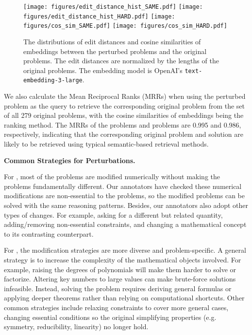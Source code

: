     \begin{figure}[htbp]
        \centering
        \texttt{[image: figures/edit\_distance\_hist\_SAME.pdf]}
        \texttt{[image: figures/edit\_distance\_hist\_HARD.pdf]}
        \texttt{[image: figures/cos\_sim\_SAME.pdf]}
        \texttt{[image: figures/cos\_sim\_HARD.pdf]}
        \caption{The distributions of edit distances and cosine similarities of embeddings between the perturbed problems and the original problems. The edit distances are normalized by the lengths of the original problems. The embedding model is OpenAI's \texttt{text-embedding-3-large}. 
        }
        \label{fig:edit_distance_cos_sim}
    \end{figure}

We also calculate the Mean Reciprocal Ranks (MRRs) when using the perturbed problem as the query to retrieve the corresponding original problem from the set of all 279 original problems, with the cosine similarities of embeddings being the ranking method. The MRRs of the \SAME problems and \HARD problems are 0.995 and 0.986, respectively, indicating that the corresponding original problem and solution are likely to be retrieved using typical semantic-based retrieval methods.















\textbf{Common Strategies for Perturbations.}




For \SAME, most of the problems are modified numerically without making the problems fundamentally different. Our annotators have checked these numerical modifications are non-essential to the problems, so the modified problems can be solved with the same reasoning patterns. 
Besides, our annotators also adopt other types of changes. For example, asking for a different but related quantity, adding/removing non-essential constraints, and changing a mathematical concept to its contrasting counterpart.






For \HARD, the modification strategies are more diverse and problem-specific. A general strategy is to increase the complexity of the mathematical objects involved. For example, raising the degrees of polynomials will make them harder to solve or factorize. Altering key numbers to large values can make brute-force solutions infeasible. Instead, solving the problem requires deriving general formulas or applying deeper theorems rather than relying on computational shortcuts. Other common strategies include relaxing constraints to cover more general cases, changing essential conditions so the original simplifying properties (e.g. symmetry, reducibility, linearity) no longer hold.











